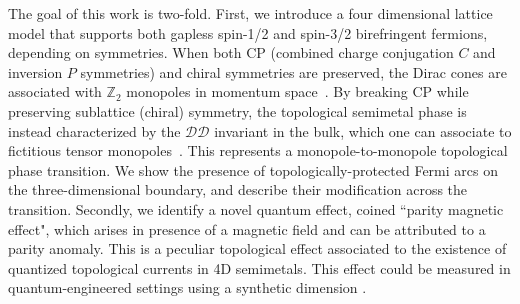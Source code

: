 \documentclass[twocolumn,prl,10pt,superscriptaddress]{revtex4}
\begin{document}

The goal of this work is two-fold. First, we introduce a four dimensional lattice model that supports both gapless spin-1/2 and spin-3/2  birefringent fermions, depending on symmetries. When both CP (combined charge conjugation $C$ and inversion $P$ symmetries) and chiral symmetries are preserved, the Dirac cones are associated with $\mathbb{Z}_{2}$ monopoles in momentum space~\cite{YXZhao2016,YXZhao2017}. By breaking CP while preserving sublattice (chiral) symmetry, the topological semimetal phase is instead characterized by the $\mathcal{DD}$ invariant in the bulk, which one can associate to fictitious tensor monopoles~\cite{Palumbo2018,Palumbo2019}. This represents a monopole-to-monopole topological phase transition. We show the presence of topologically-protected Fermi arcs on the three-dimensional boundary, and describe their modification across the transition.
Secondly, we identify a novel quantum effect, coined ``parity magnetic effect", which arises in presence of a magnetic field and can be attributed to a parity anomaly. This is a peculiar topological effect associated to the existence of quantized topological currents in 4D semimetals. This effect could be measured in quantum-engineered settings using a synthetic dimension \cite{HMPrice2020,Ozawa2016,Ozawa2019}.
\end{document}
